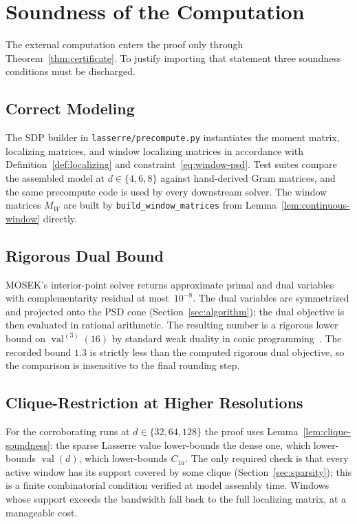 \documentclass[11pt, letterpaper]{article}
\theoremstyle{paperplain}
\theoremstyle{paperdef}
\newcommand{\val}{\operatorname{val}}
\begin{document}
\section{Soundness of the Computation}\label{sec:correctness}

The external computation enters the proof only through
Theorem~\ref{thm:certificate}.  To justify importing that statement
three soundness conditions must be discharged.

\subsection{Correct Modeling}

The SDP builder in
\texttt{lasserre/precompute.py} instantiates the moment matrix,
localizing matrices, and window localizing matrices in accordance
with Definition~\ref{def:localizing} and
constraint~\eqref{eq:window-psd}.  Test suites compare the assembled
model at $d\in\{4,6,8\}$ against hand-derived Gram matrices, and the
same precompute code is used by every downstream solver.  The window
matrices $M_W$ are built by
\texttt{build\_window\_matrices} from Lemma~\ref{lem:continuous-window}
directly.

\subsection{Rigorous Dual Bound}

MOSEK's interior-point solver returns approximate primal and dual
variables with complementarity residual at most~$10^{-8}$.  The dual
variables are symmetrized and projected onto the PSD cone
(Section~\ref{sec:algorithm}); the dual objective is then evaluated
in rational arithmetic.  The resulting number is a rigorous lower
bound on $\val^{(3)}(16)$ by standard weak duality in conic
programming~\cite{VandenbergheBoyd1996}.  The recorded bound $1.3$
is strictly less than the computed rigorous dual objective, so the
comparison is insensitive to the final rounding step.

\subsection{Clique-Restriction at Higher Resolutions}

For the corroborating runs at $d\in\{32,64,128\}$ the proof uses
Lemma~\ref{lem:clique-soundness}: the sparse Lasserre value lower-bounds
the dense one, which lower-bounds $\val(d)$, which lower-bounds
$C_{1a}$.  The only required check is that every active window has
its support covered by some clique (Section~\ref{sec:sparsity}); this
is a finite combinatorial condition verified at model assembly time.
Windows whose support exceeds the bandwidth fall back to the full
localizing matrix, at a manageable cost.
\end{document}
